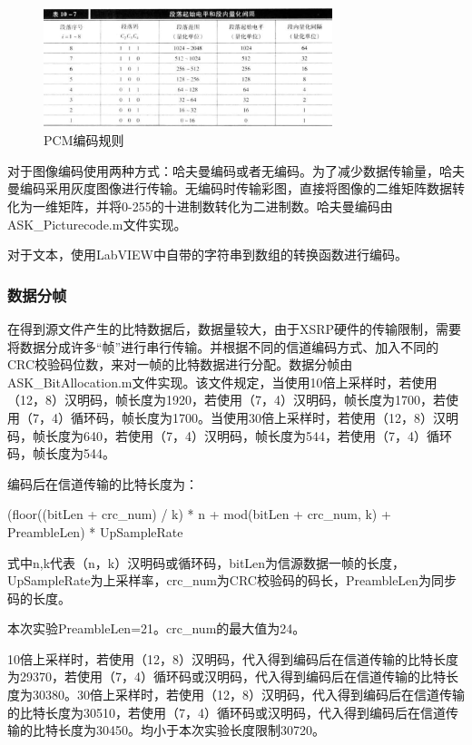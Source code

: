 \documentclass[UTF8]{ctexart}
\begin{document}
\begin{figure}[H]
    \centering
    
    \includegraphics[width=0.75\textwidth]{pics/4.png}
    \caption{PCM编码规则}\label{fig:4}

\end{figure}

对于图像编码使用两种方式：哈夫曼编码或者无编码。为了减少数据传输量，哈夫曼编码采用灰度图像进行传输。无编码时传输彩图，直接将图像的二维矩阵数据转化为一维矩阵，并将0-255的十进制数转化为二进制数。哈夫曼编码由ASK\_Picturecode.m文件实现。

对于文本，使用LabVIEW中自带的字符串到数组的转换函数进行编码。

\subsubsection{数据分帧}
在得到源文件产生的比特数据后，数据量较大，由于XSRP硬件的传输限制，需要将数据分成许多“帧”进行串行传输。并根据不同的信道编码方式、加入不同的CRC校验码位数，来对一帧的比特数据进行分配。数据分帧由ASK\_BitAllocation.m文件实现。该文件规定，当使用10倍上采样时，若使用（12，8）汉明码，帧长度为1920，若使用（7，4）汉明码，帧长度为1700，若使用（7，4）循环码，帧长度为1700。当使用30倍上采样时，若使用（12，8）汉明码，帧长度为640，若使用（7，4）汉明码，帧长度为544，若使用（7，4）循环码，帧长度为544。

编码后在信道传输的比特长度为：

(floor((bitLen + crc\_num) / k) * n + mod(bitLen + crc\_num, k) + PreambleLen) * UpSampleRate

式中n,k代表（n，k）汉明码或循环码，bitLen为信源数据一帧的长度，UpSampleRate为上采样率，crc\_num为CRC校验码的码长，PreambleLen为同步码的长度。

本次实验PreambleLen=21。crc\_num的最大值为24。

10倍上采样时，若使用（12，8）汉明码，代入得到编码后在信道传输的比特长度为29370，若使用（7，4）循环码或汉明码，代入得到编码后在信道传输的比特长度为30380。30倍上采样时，若使用（12，8）汉明码，代入得到编码后在信道传输的比特长度为30510，若使用（7，4）循环码或汉明码，代入得到编码后在信道传输的比特长度为30450。均小于本次实验长度限制30720。
\end{document}
